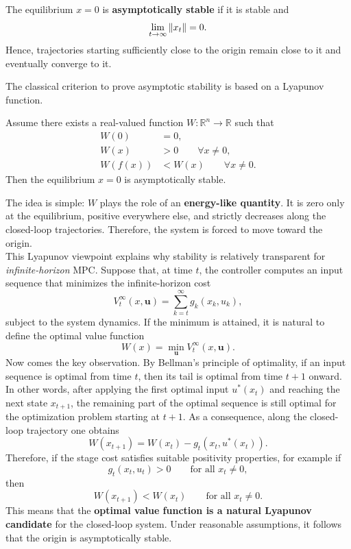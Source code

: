 \begin{theorembox}
The equilibrium $x=0$ is \textbf{asymptotically stable} if it is stable and
\[
\lim_{t\to\infty}\left\lVert x_t \right\rVert=0.
\]
Hence, trajectories starting sufficiently close to the origin remain close to it and eventually converge to it.
\end{theorembox}

The classical criterion to prove asymptotic stability is based on a Lyapunov function.

\begin{theorembox}
Assume there exists a real-valued function $W:\mathbb{R}^n\to\mathbb{R}$ such that
\begin{align*}
W(0) &= 0,\\
W(x) &> 0 \qquad \forall x\neq 0,\\
W(f(x)) &< W(x) \qquad \forall x\neq 0.
\end{align*}
Then the equilibrium $x=0$ is asymptotically stable.
\end{theorembox}

The idea is simple: $W$ plays the role of an \textbf{energy-like quantity}. It is zero only at the equilibrium, positive everywhere else, and strictly decreases along the closed-loop trajectories. Therefore, the system is forced to move toward the origin.\\

This Lyapunov viewpoint explains why stability is relatively transparent for \emph{infinite-horizon} MPC. Suppose that, at time $t$, the controller computes an input sequence that minimizes the infinite-horizon cost
\[
V_t^\infty(x,\mathbf{u}) = \sum_{k=t}^{\infty} g_k(x_k,u_k),
\]
subject to the system dynamics. If the minimum is attained, it is natural to define the optimal value function
\[
W(x) = \min_{\mathbf{u}} V_t^\infty(x,\mathbf{u}).
\]
Now comes the key observation. By Bellman's principle of optimality, if an input sequence is optimal from time $t$, then its tail is optimal from time $t+1$ onward. In other words, after applying the first optimal input $u^*(x_t)$ and reaching the next state $x_{t+1}$, the remaining part of the optimal sequence is still optimal for the optimization problem starting at $t+1$. As a consequence, along the closed-loop trajectory one obtains
\[
W(x_{t+1}) = W(x_t) - g_t(x_t,u^*(x_t)).
\]
Therefore, if the stage cost satisfies suitable positivity properties, for example if
\[
g_t(x_t,u_t) > 0 \qquad \text{for all } x_t\neq 0,
\]
then
\[
W(x_{t+1}) < W(x_t) \qquad \text{for all } x_t\neq 0.
\]
This means that the \textbf{optimal value function is a natural Lyapunov candidate} for the closed-loop system. Under reasonable assumptions, it follows that the origin is asymptotically stable.\\

